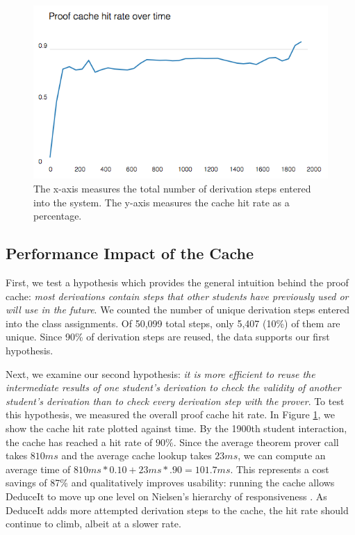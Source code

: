 \documentclass{sigchi}
\begin{document}
\begin{figure}[!h]
\centering
\includegraphics[width=1\columnwidth]{cache}
\caption{The x-axis measures the total number of derivation steps entered into the system. The y-axis measures the cache hit rate as a percentage.}
\label{fig:proofcache}
\end{figure}

\subsection{Performance Impact of the Cache}
First, we test a hypothesis which provides the general intuition behind the proof cache: \textit{most derivations contain steps that other students have previously used or will use in the future}. We counted the number of unique derivation steps entered into the class assignments. Of 50,099 total steps, only 5,407 (10\%) of them are unique. Since 90\% of derivation steps are reused, the data supports our first hypothesis.

Next, we examine our second hypothesis: \textit{it is more efficient to reuse the intermediate results of one student's derivation to check the validity of another student's derivation than to check every derivation step with the prover}. To test this hypothesis, we measured the overall proof cache hit rate. In Figure \ref{fig:proofcache}, we show the cache hit rate plotted against time. By the 1900th student interaction, the cache has reached a hit rate of $90\%$. Since the average theorem prover call takes $810ms$ and the average cache lookup takes $23ms$, we can compute an average time of $810ms*0.10+23ms*.90=101.7ms$. This represents a cost savings of 87\% and qualitatively improves usability: running the cache allows DeduceIt to move up one level on Nielsen's hierarchy of responsiveness \cite{neilsen}. As DeduceIt adds more attempted derivation steps to the cache, the hit rate should continue to climb, albeit at a slower rate.
\end{document}
